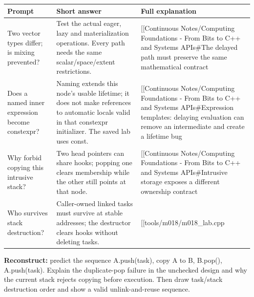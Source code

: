 {\def\LTcaptype{none} %
\begin{longtable}[]{@{}
  >{\raggedright\arraybackslash}p{}
  >{\raggedright\arraybackslash}p{}
  >{\raggedright\arraybackslash}p{}@{}}
\toprule\noalign{}
\begin{minipage}[b]{\linewidth}\raggedright
Prompt
\end{minipage} & \begin{minipage}[b]{\linewidth}\raggedright
Short answer
\end{minipage} & \begin{minipage}[b]{\linewidth}\raggedright
Full explanation
\end{minipage} \\
\midrule\noalign{}
\endhead
\bottomrule\noalign{}
\endlastfoot
Two vector types differ; is mixing prevented? & Test the actual eager, lazy and materialization operations. Every path needs the same scalar/space/extent restrictions. & {[}{[}Continuous Notes/Computing Foundations - From Bits to C++ and Systems APIs\#The delayed path must preserve the same mathematical contract \\
Does a named inner expression become constexpr? & Naming extends this node's usable lifetime; it does not make references to automatic locals valid in that constexpr initializer. The saved lab uses const. & {[}{[}Continuous Notes/Computing Foundations - From Bits to C++ and Systems APIs\#Expression templates: delaying evaluation can remove an intermediate and create a lifetime bug \\
Why forbid copying this intrusive stack? & Two head pointers can share hooks; popping one clears membership while the other still points at that node. & {[}{[}Continuous Notes/Computing Foundations - From Bits to C++ and Systems APIs\#Intrusive storage exposes a different ownership contract \\
Who survives stack destruction? & Caller-owned linked tasks must survive at stable addresses; the destructor clears hooks without deleting tasks. & {[}{[}tools/m018/m018\_lab.cpp \\
\end{longtable}
}

\textbf{Reconstruct:} predict the sequence A.push(task), copy A to B, B.pop(), A.push(task). Explain the duplicate-pop failure in the unchecked design and why the current stack rejects copying before execution. Then draw task/stack destruction order and show a valid unlink-and-reuse sequence.

